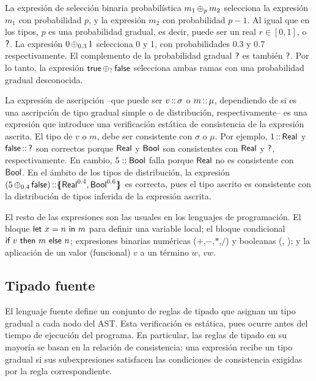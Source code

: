 La expresión de selección binaria probabilística $m_1 \mathop{\oplus_{p}} m_2$ selecciona la expresión $m_1$ con probabilidad $p$, y la expresión $m_2$ con probabilidad $p-1$. Al igual que en los tipos, $p$ es una probabilidad gradual, es decir, puede ser un real $r\in[0,1]$, o $\mathord{\text{\sffamily ?}}$. La expresión $0 \mathop{\oplus_{0.3}} 1$ selecciona 0 y 1, con probabilidades 0.3 y 0.7 respectivamente. El complemento de la probabilidad gradual $\mathord{\text{\sffamily ?}}$ es también $\mathord{\text{\sffamily ?}}$. Por lo tanto, la expresión $\mathord{\text{\sffamily true}} \mathop{\oplus_{?}} \mathord{\text{\sffamily false}}$ selecciona ambas ramas con una probabilidad gradual desconocida.

La expresión de ascripción --que puede ser $v\mathop{\text{\sffamily ::}} \sigma$ o $m \mathop{\text{\sffamily ::}} \mu$, dependiendo de si es una ascripción de tipo gradual simple o de distribución, respectivamente-- es una expresión que introduce una verificación estática de consistencia de la expresión ascrita. El tipo de $v$ o $m$, debe ser consistente con $\sigma$ o $\mu$. Por ejemplo, $1 \mathop{\text{\sffamily ::}} \mathord{\text{\sffamily Real}}$ y $\mathord{\text{\sffamily false}}\mathop{\text{\sffamily ::}}\mathord{\text{\sffamily ?}}$ son correctos porque $\mathord{\text{\sffamily Real}}$ y $\mathord{\text{\sffamily Bool}}$ son consistentes con $\mathord{\text{\sffamily Real}}$ y $\mathord{\text{\sffamily ?}}$, respectivamente. En cambio, $5 :: \mathord{\text{\sffamily Bool}}$ falla porque $\mathord{\text{\sffamily Real}}$ no es consistente con $\mathord{\text{\sffamily Bool}}$. En el ámbito de los tipos de distribución, la expresión $(5 \mathop{\oplus_{0.4}} \mathord{\text{\sffamily false}}) \mathop{\text{\sffamily ::}} \{\mskip-7mu\{ {\mathord{\text{\sffamily Real}} ^ {0.4} , \mathord{\text{\sffamily Bool}} ^ {0.6}} \}\mskip-7mu\}$ es correcta, pues el tipo ascrito es consistente con la distribución de tipos inferida de la expresión ascrita.

El resto de las expresiones son las usuales en los lenguajes de programación. El bloque $\text{\sffamily let } {x} = {n} \text{\sffamily { in }} {m}$ para definir una variable local;  el bloque condicional $\text{\sffamily {if }} {v} \text{\sffamily { then }} {m} \text{\sffamily { else }} {n}$; expresiones binarias numéricas ($+$,$-$,$*$,$/$) y booleanas (\andop, \orop); y la aplicación de un valor (funcional) $v$ a un término $w$, $vw$.


  \subsection{Tipado fuente}\label{par:lang-source-static} El lenguaje fuente define un conjunto de reglas de tipado que asignan un tipo gradual a cada nodo del AST. Esta verificación es estática, pues ocurre antes del tiempo de ejecución del programa. En particular, las reglas de tipado en su mayoría se basan en la relación de consistencia: una expresión recibe un tipo gradual si sus subexpresiones satisfacen las condiciones de consistencia exigidas por la regla correspondiente.

  

